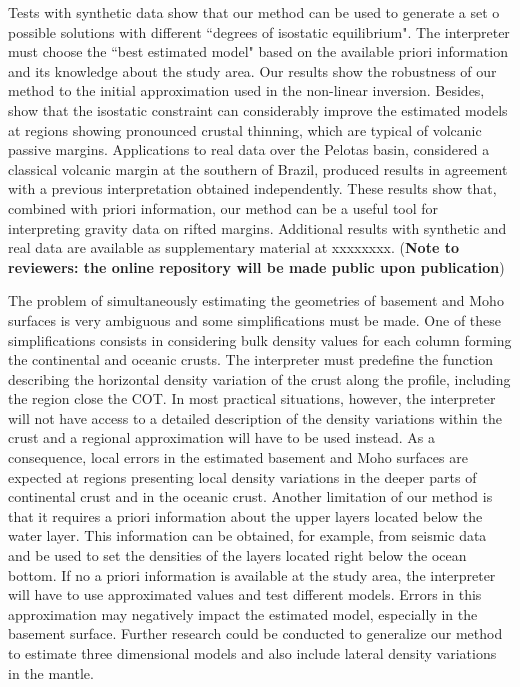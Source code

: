 \documentclass[manuscript]{geophysics}
\begin{document}
Tests with synthetic data show that our method can be used to generate a set o possible 
solutions with different ``degrees of isostatic equilibrium". 
The interpreter must choose the ``best estimated model" based on the available priori 
information and its knowledge about the study area.
Our results show the robustness of our method to the initial approximation
used in the non-linear inversion. Besides, show that 
the isostatic constraint can considerably improve 
the estimated models at regions showing pronounced crustal thinning, which 
are typical of volcanic passive margins. 
Applications to real data over the Pelotas basin, considered a classical volcanic
margin at the southern of Brazil, produced results in agreement with a previous 
interpretation obtained independently.
These results show that, combined with priori information, our method can be a 
useful tool for interpreting gravity data on rifted margins.
Additional results with synthetic and real data are available as supplementary material at xxxxxxxx.
(\textbf{Note to reviewers: the online repository will be made public upon publication})

The problem of simultaneously estimating the geometries of basement and Moho surfaces
is very ambiguous and some simplifications must be made. 
One of these simplifications consists in considering bulk density 
values for each column forming the continental and oceanic crusts. 
The interpreter must predefine the function describing the horizontal density
variation of the crust along the profile, including the region 
close the COT.
In most practical situations, however, the interpreter will not have access to a detailed
description of the density variations within the crust and a regional approximation
will have to be used instead.
As a consequence, local errors in the estimated basement and Moho surfaces are expected 
at regions presenting local density variations in the deeper parts of continental crust 
and in the oceanic crust.
Another limitation of our method is that it requires a priori information about the
upper layers located below the water layer.
This information can be obtained, for example, from seismic data and be used to set
the densities of the layers located right below the ocean bottom.
If no a priori information is available at the study area, the interpreter will have to use
approximated values and test different models.
Errors in this approximation may negatively impact the estimated model, especially in 
the basement surface.
Further research could be conducted to generalize our method to estimate
three dimensional models and also include lateral density variations in 
the mantle.
\end{document}
